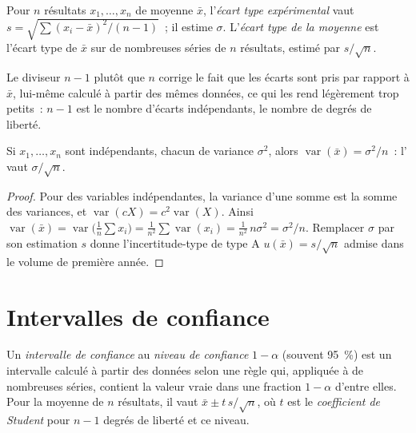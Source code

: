 \begin{definition}[Dispersion]\label{def:b2:measurement-statistics:dispersion}
Pour $n$ résultats $x_1, \dots, x_n$ de moyenne $\bar x$, l'\emph{écart type
expérimental} vaut $s = \sqrt{\sum (x_i - \bar x)^2/(n-1)}$~;
il estime $\sigma$. L'\emph{écart type de la moyenne} est
l'écart type de $\bar x$ sur de nombreuses séries de $n$ résultats, estimé par $s/\sqrt n$.
\end{definition}

Le diviseur $n - 1$ plutôt que $n$ corrige le fait que les écarts sont pris par rapport à $\bar x$,
lui-même calculé à partir des mêmes données, ce qui les rend légèrement trop petits~: $n - 1$ est le
nombre d'écarts indépendants, le nombre de degrés de liberté.

\begin{theorem}\label{thm:b2:measurement-statistics:mean-variance}
Si $x_1, \dots, x_n$ sont indépendants, chacun de variance $\sigma^2$, alors $\operatorname{var}(\bar x) =
\sigma^2/n$~: l' vaut $\sigma/\sqrt n$.
\end{theorem}

\begin{proof}
Pour des variables indépendantes, la variance d'une somme est la somme des variances, et
$\operatorname{var}(cX) = c^2\operatorname{var}(X)$. Ainsi $\operatorname{var}(\bar x) =
\operatorname{var}\bigl(\tfrac1n\sum x_i\bigr) = \tfrac{1}{n^2}\sum\operatorname{var}(x_i) =
\tfrac{1}{n^2}\,n\sigma^2 = \sigma^2/n$. Remplacer $\sigma$ par son estimation $s$ donne l'incertitude-type
de type A $u(\bar x) = s/\sqrt n$ admise dans le volume de première année.
\end{proof}

\section{Intervalles de confiance}

\begin{definition}\label{def:b2:measurement-statistics:confidence}
Un \emph{intervalle de confiance} au \emph{niveau de confiance}
$1 - \alpha$ (souvent 95~\%) est un intervalle calculé à partir des données selon une règle qui,
appliquée à de nombreuses séries, contient la valeur vraie dans une fraction $1 - \alpha$ d'entre elles.
Pour la moyenne de $n$ résultats, il vaut $\bar x \pm t\,s/\sqrt n$, où $t$ est le \emph{coefficient de
Student} pour $n - 1$ degrés de liberté et ce niveau.
\end{definition}

